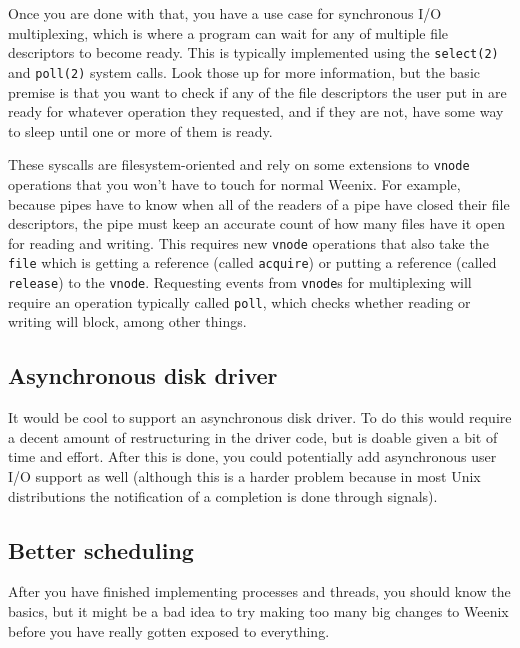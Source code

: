 Once you are done with that, you have a use case for synchronous I/O multiplexing, which is where a program can wait for any of multiple file descriptors to become ready. This is typically implemented using the \texttt{select(2)} and \texttt{poll(2)} system calls. Look those up for more information, but the basic premise is that you want to check if any of the file descriptors the user put in are ready for whatever operation they requested, and if they are not, have some way to sleep until one or more of them is ready.

These syscalls are filesystem-oriented and rely on some extensions to \texttt{vnode} operations that you won't have to touch for normal Weenix. For example, because pipes have to know when all of the readers of a pipe have closed their file descriptors, the pipe must keep an accurate count of how many files have it open for reading and writing. This requires new \texttt{vnode} operations that also take the \texttt{file} which is getting a reference (called \texttt{acquire}) or putting a reference (called \texttt{release}) to the \texttt{vnode}. Requesting events from \texttt{vnode}s for multiplexing will require an operation typically called \texttt{poll}, which checks whether reading or writing will block, among other things.

\subsection{Asynchronous disk driver}
It would be cool to support an asynchronous disk driver. To do this would require a decent amount of restructuring in the driver code, but is doable given a bit of time and effort. After this is done, you could potentially add asynchronous user I/O support as well (although this is a harder problem because in most Unix distributions the notification of a completion is done through signals).

\subsection{Better scheduling}
After you have finished implementing processes and threads, you should know the basics, but it might be a bad idea to try making too many big changes to Weenix before you have really gotten exposed to everything. %


